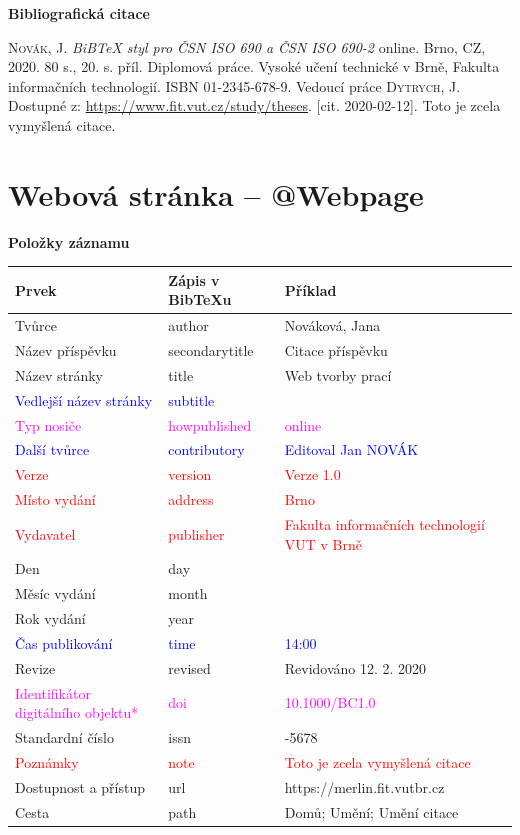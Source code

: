 \bigskip

\noindent \textbf{Bibliografická citace}

\medskip

\noindent \textsc{Novák}, J. \textit{BiBTeX styl pro ČSN ISO 690 a ČSN ISO 690-2} online. Brno, CZ, 2020. 80 s., 20. s. příl. Diplomová práce. Vysoké učení technické v Brně, Fakulta informačních technologií. ISBN 01-2345-678-9. Vedoucí práce \textsc{Dytrych}, J. Dostupné z: \url{https://www.fit.vut.cz/study/theses}. [cit. 2020-02-12]. Toto je zcela vymyšlená citace.
\newpage
\section*{Webová stránka -- @Webpage}
\label{pr-webpage}
\noindent \textbf{Položky záznamu}

\medskip

\begin{tabularx}{0.95\linewidth}{>{\raggedright\arraybackslash}X X >{\raggedright\arraybackslash}X}
    Prvek & Zápis v BibTeXu & Příklad\\\hline
    Tvůrce & author & Nováková, Jana\\
    Název příspěvku & secondarytitle & Citace příspěvku\\
    Název stránky & title & Web tvorby prací\\
    \textcolor{blue}{Vedlejší název stránky}  &  \textcolor{blue}{subtitle} & \\
    \textcolor{magenta}{Typ nosiče} & \textcolor{magenta}{howpublished} & \textcolor{magenta}{online}\\
    \textcolor{blue}{Další tvůrce} & \textcolor{blue}{contributory} & \textcolor{blue}{Editoval Jan NOVÁK}\\
    \textcolor{red}{Verze} & \textcolor{red}{version} & \textcolor{red}{Verze 1.0}\\
    \textcolor{red}{Místo vydání} & \textcolor{red}{address} & \textcolor{red}{Brno}\\
    \textcolor{red}{Vydavatel} & \textcolor{red}{publisher} & \textcolor{red}{Fakulta informačních technologií VUT v Brně}\\
    Den & day & 12\\
    Měsíc vydání & month & 2\\
    Rok vydání & year & 2020\\
    \textcolor{blue}{Čas publikování} & \textcolor{blue}{time} & \textcolor{blue}{14:00}\\
    Revize & revised & Revidováno 12. 2. 2020\\
    \textcolor{magenta}{Identifikátor digitálního objektu*} & \textcolor{magenta}{doi} & \textcolor{magenta}{10.1000/BC1.0}\\
    Standardní číslo & issn & 1234-5678\\
    \textcolor{red}{Poznámky} & \textcolor{red}{note} & \textcolor{red}{Toto je zcela vymyšlená citace}\\
    Dostupnost a přístup & url & https://merlin.fit.vutbr.cz\\
    Cesta & path & Domů; Umění; Umění citace
\end{tabularx}

